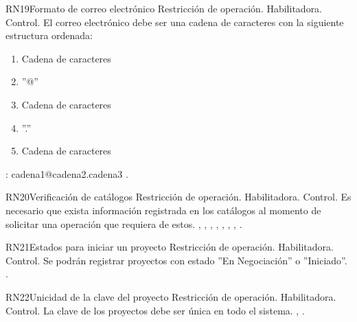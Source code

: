 \begin{BussinesRule}{RN19}{Formato de correo electrónico} 
	\BRitem[Tipo:] Restricción de operación. 
	\BRitem[Clase:] Habilitadora. 
	\BRitem[Nivel:] Control. %
	\BRitem[Descripción:] El correo electrónico debe ser una cadena de caracteres con la siguiente estructura ordenada:
	\begin{enumerate}
		\item Cadena de caracteres
		\item ''@''
		\item Cadena de caracteres
		\item ''.''
		\item Cadena de caracteres
	\end{enumerate}
	\BRitem[Ejemplo]: cadena1@cadena2.cadena3
	 \UCref{}{}. 
\end{BussinesRule}

\begin{BussinesRule}{RN20}{Verificación de catálogos} 
	\BRitem[Tipo:] Restricción de operación. 
	\BRitem[Clase:] Habilitadora. 
	\BRitem[Nivel:] Control. %
	\BRitem[Descripción:] Es necesario que exista información registrada en los catálogos al momento de solicitar una operación que requiera de estos.
	 , , , , , , , . 
\end{BussinesRule}


\begin{BussinesRule}{RN21}{Estados para iniciar un proyecto} 
	\BRitem[Tipo:] Restricción de operación. 
	\BRitem[Clase:] Habilitadora. 
	\BRitem[Nivel:] Control. %
	\BRitem[Descripción:] Se podrán registrar proyectos con estado ''En Negociación'' o ''Iniciado''.
	 \UCref{}{}. 
\end{BussinesRule}

\begin{BussinesRule}{RN22}{Unicidad de la clave del proyecto} 
	\BRitem[Tipo:] Restricción de operación. 
	\BRitem[Clase:] Habilitadora. 
	\BRitem[Nivel:] Control. %
	\BRitem[Descripción:] La clave de los proyectos debe ser única en todo el sistema.
	 , . 
\end{BussinesRule}

